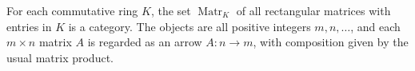 For each commutative ring $K$, the set $\operatorname{Matr}_K$ of all rectangular matrices with entries in $K$ is a category. The objects are all positive integers $m, n, \ldots$, and each $m \times n$ matrix $A$ is regarded as an arrow $A : n \to m$, with composition given by the usual matrix product.
